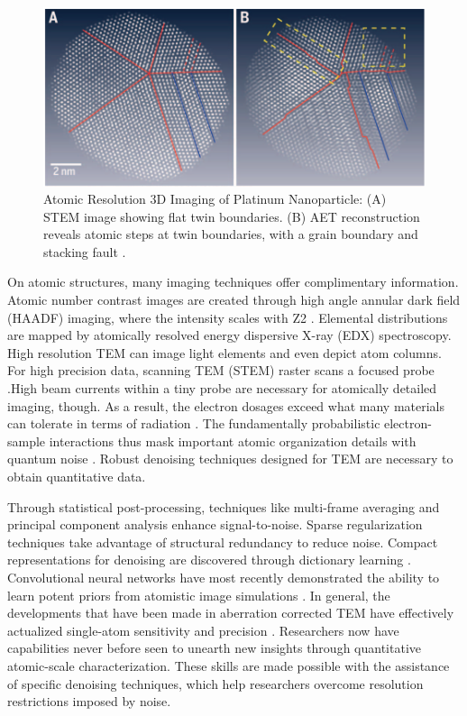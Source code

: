 \vspace{5pt}

\begin{figure}[thbp]
    \centering
    \includegraphics[width=.8\textwidth]{img/Atomic Resolution.png}
    \caption{Atomic Resolution 3D Imaging of Platinum Nanoparticle: (A) STEM image showing flat twin boundaries. (B) AET reconstruction reveals atomic steps at twin boundaries, with a grain boundary and stacking fault \cite{Miao2016}.}\label{fig: Atomic Resolution comparative reconstruction}
\end{figure}

On atomic structures, many imaging techniques offer complimentary information. Atomic number contrast images are created through high angle annular dark field (HAADF) imaging, where the intensity scales with Z2 \cite{Miao2016}. Elemental distributions are mapped by atomically resolved energy dispersive X-ray (EDX) spectroscopy. High resolution TEM can image light elements and even depict atom columns. For high precision data, scanning TEM (STEM) raster scans a focused probe \cite{MacLaren2014}.High beam currents within a tiny probe are necessary for atomically detailed imaging, though. As a result, the electron dosages exceed what many materials can tolerate in terms of radiation \cite{Muller2009}. The fundamentally probabilistic electron-sample interactions thus mask important atomic organization details with quantum noise \cite{Linck2016}. Robust denoising techniques designed for TEM are necessary to obtain quantitative data.
\vspace{10pt}

Through statistical post-processing, techniques like multi-frame averaging \cite{MacLaren2014} and principal component analysis enhance signal-to-noise. Sparse regularization techniques take advantage of structural redundancy to reduce noise. Compact representations for denoising are discovered through dictionary learning \cite{Miao2016}. Convolutional neural networks have most recently demonstrated the ability to learn potent priors from atomistic image simulations \cite{Miao2016}. In general, the developments that have been made in aberration corrected TEM have effectively actualized single-atom sensitivity and precision \cite{Linck2016}. Researchers now have capabilities never before seen to unearth new insights through quantitative atomic-scale characterization. These skills are made possible with the assistance of specific denoising techniques, which help researchers overcome resolution restrictions imposed by noise.



